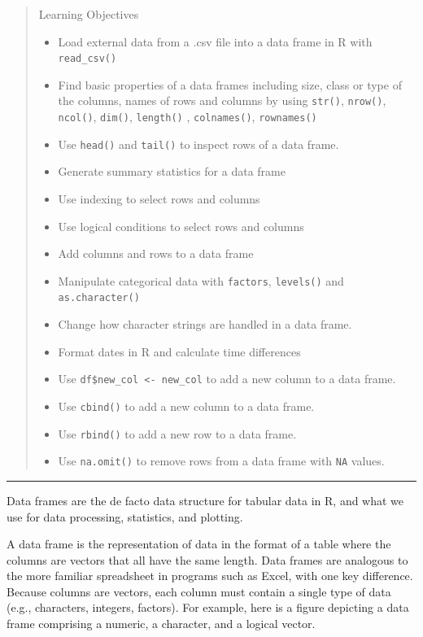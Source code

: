 \documentclass[
]{book}
\providecommand{\tightlist}{%
  \setlength{\itemsep}{0pt}\setlength{\parskip}{0pt}}
\begin{document}
\begin{quote}
Learning Objectives

\begin{itemize}
\tightlist
\item
  Load external data from a .csv file into a data frame in R with \texttt{read\_csv()}
\item
  Find basic properties of a data frames including size, class or type of the columns, names of rows and columns by using \texttt{str()}, \texttt{nrow()}, \texttt{ncol()}, \texttt{dim()}, \texttt{length()} , \texttt{colnames()}, \texttt{rownames()}
\item
  Use \texttt{head()} and \texttt{tail()} to inspect rows of a data frame.
\item
  Generate summary statistics for a data frame
\item
  Use indexing to select rows and columns
\item
  Use logical conditions to select rows and columns
\item
  Add columns and rows to a data frame
\item
  Manipulate categorical data with \texttt{factors}, \texttt{levels()} and \texttt{as.character()}
\item
  Change how character strings are handled in a data frame.
\item
  Format dates in R and calculate time differences
\item
  Use \texttt{df\$new\_col\ \textless{}-\ new\_col} to add a new column to a data frame.
\item
  Use \texttt{cbind()} to add a new column to a data frame.
\item
  Use \texttt{rbind()} to add a new row to a data frame.
\item
  Use \texttt{na.omit()} to remove rows from a data frame with \texttt{NA} values.
\end{itemize}
\end{quote}

\begin{center}\rule{0.5\linewidth}{0.5pt}\end{center}

Data frames are the de facto data structure for tabular data in R, and what we use for data processing, statistics, and plotting.

A data frame is the representation of data in the format of a table where the columns are vectors that all have the same length. Data frames are analogous to the more familiar spreadsheet in programs such as Excel, with one key difference. Because columns are vectors, each column must contain a single type of data (e.g., characters, integers, factors). For example, here is a figure depicting a data frame comprising a numeric, a character, and a logical vector.
\end{document}
